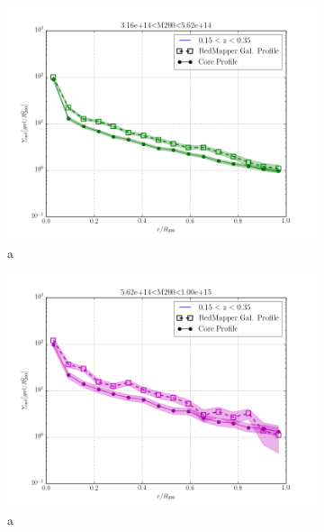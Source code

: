 \documentclass[twocolumn]{article}
\begin{document}
\begin{figure}
\begin{subfigure}{.5\textwidth}
    \centering\includegraphics[width=1.0\linewidth]{figs/cfn/basic_rd.param/plot_zmrs.py/fig4.png}
    \caption{a}
  \end{subfigure}%
  \begin{subfigure}{.5\textwidth}
    \centering\includegraphics[width=1.0\linewidth]{figs/cfn/basic_rd.param/plot_zmrs.py/fig5.png}
    \caption{a}
  \end{subfigure}
  \begin{subfigure}{.5\textwidth}

\end{subfigure}
\end{figure}
\end{document}
